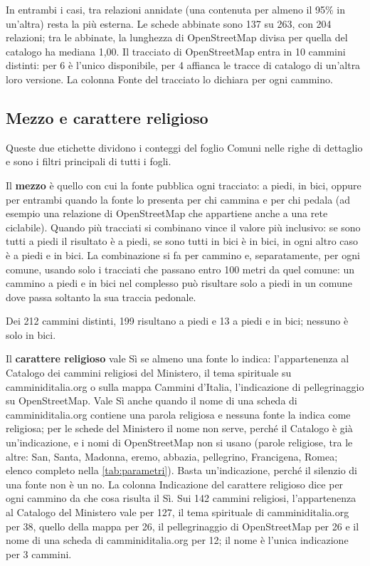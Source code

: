 In entrambi i casi, tra relazioni annidate (una contenuta per almeno il 95\% in un'altra) resta la più esterna. Le schede abbinate sono 137 su 263, con 204 relazioni; tra le abbinate, la lunghezza di OpenStreetMap divisa per quella del catalogo ha mediana 1,00. Il tracciato di OpenStreetMap entra in 10 cammini distinti: per 6 è l'unico disponibile, per 4 affianca le tracce di catalogo di un'altra loro versione. La colonna Fonte del tracciato lo dichiara per ogni cammino.

\subsection{Mezzo e carattere religioso}\label{sec:etichette}

Queste due etichette dividono i conteggi del foglio Comuni nelle righe di dettaglio e sono i filtri principali di tutti i fogli.

Il \textbf{mezzo} è quello con cui la fonte pubblica ogni tracciato: a piedi, in bici, oppure per entrambi quando la fonte lo presenta per chi cammina e per chi pedala (ad esempio una relazione di OpenStreetMap che appartiene anche a una rete ciclabile). Quando più tracciati si combinano vince il valore più inclusivo: se sono tutti a piedi il risultato è a piedi, se sono tutti in bici è in bici, in ogni altro caso è a piedi e in bici. La combinazione si fa per cammino e, separatamente, per ogni comune, usando solo i tracciati che passano entro 100 metri da quel comune: un cammino a piedi e in bici nel complesso può risultare solo a piedi in un comune dove passa soltanto la sua traccia pedonale.

Dei 212 cammini distinti, 199 risultano a piedi e 13 a piedi e in bici; nessuno è solo in bici.

Il \textbf{carattere religioso} vale Sì se almeno una fonte lo indica: l'appartenenza al Catalogo dei cammini religiosi del Ministero, il tema spirituale su camminiditalia.org o sulla mappa Cammini d'Italia, l'indicazione di pellegrinaggio su OpenStreetMap. Vale Sì anche quando il nome di una scheda di camminiditalia.org contiene una parola religiosa e nessuna fonte la indica come religiosa; per le schede del Ministero il nome non serve, perché il Catalogo è già un'indicazione, e i nomi di OpenStreetMap non si usano (parole religiose, tra le altre: San, Santa, Madonna, eremo, abbazia, pellegrino, Francigena, Romea; elenco completo nella \cref{tab:parametri}). Basta un'indicazione, perché il silenzio di una fonte non è un no. La colonna Indicazione del carattere religioso dice per ogni cammino da che cosa risulta il Sì. Sui 142 cammini religiosi, l'appartenenza al Catalogo del Ministero vale per 127, il tema spirituale di camminiditalia.org per 38, quello della mappa per 26, il pellegrinaggio di OpenStreetMap per 26 e il nome di una scheda di camminiditalia.org per 12; il nome è l'unica indicazione per 3 cammini.

